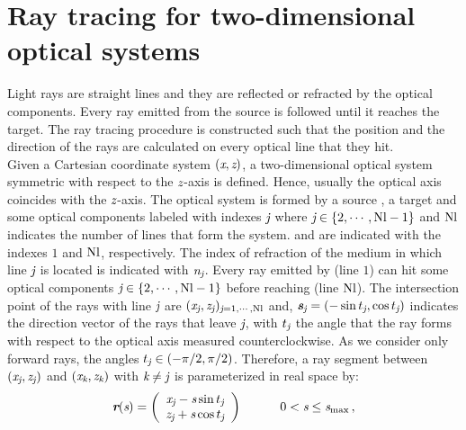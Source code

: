 \section{Ray tracing for two-dimensional optical systems}\label{sec:raytracing}
Light rays are straight lines and they are reflected or refracted by the optical components.
Every ray emitted from the source is followed until it reaches the target.  
The ray tracing procedure is constructed such that the position and the direction of the rays are calculated on every optical line that they hit. \\ \indent
Given a Cartesian coordinate system $(\textit{x}, \textit{z})$, a two-dimensional optical system symmetric with respect to the $\textit{z}$-axis is defined.
Hence, usually the optical axis coincides with the $\textit{z}$-axis.
The optical system is formed by a source , a target   and some optical components labeled with indexes $\textit{j}$ where $\textit{j} \in \{2, \cdots, \textrm{Nl}-1\}$ and $\textrm{Nl}$
 indicates the number of lines that form the system.  and  are indicated with the indexes $1$ and $\textrm{Nl}$, respectively.
The index of refraction of the medium in which line $\textit{j}$ is located is indicated with $\textit{n}_{\textit{j}}$.
Every ray emitted by  (line $1$) can hit some optical components $\textit{j}\in\{2, \cdots, \textrm{Nl} -1\}$ before reaching  (line $\textrm{Nl}$).
The intersection point of the rays with line $\textit{j}$ are $(\textit{x}_{\textit{j}}, \textit{z}_{\textit{j}})_{\textit{j} =1, \cdots, \textrm{Nl}}$ and, $\textit{\textbf{s}}_{\textit{j}}= (-\sin t_{\textit{j}}, \cos t_{\textit{j}})$ indicates the direction vector of the rays that leave $\textit{j}$,
with $t_{\textit{j}}$ the angle that the ray forms with respect to the optical axis measured counterclockwise. As we consider only forward rays, the angles
$t_{\textit{j}}\in (-\pi/2, \pi/2)$.
Therefore, a ray segment between $(\textit{x}_{\textit{j}}, \textit{z}_{\textit{j}})$ and $(\textit{x}_{\textit{k}}, \textit{z}_{\textit{k}})$
with $\textit{k}\neq\textit{j}$ is parameterized in real space by:
\begin{equation}
\label{parametrization}
\textit{\textbf{r}}(\textit{s})=
\left( \begin{array}{cc}
\textit{x}_{\textit{j}}-\textit{s}\sin t_{\textit{j}} \\
\textit{z}_{\textit{j}}+\textit{s}\cos t_{\textit{j}}\end{array} \right) \qquad \quad 0< \textit{s}\leq \textit{s}_{\textrm{max}}\,,
\end{equation}
